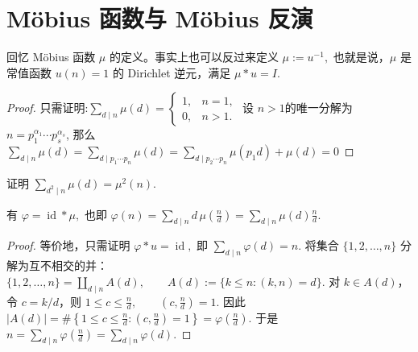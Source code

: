 \section{Möbius 函数与 Möbius 反演}

回忆 Möbius 函数 $\mu$ 的定义。事实上也可以反过来定义
\(\textstyle \mu:=\allowbreak{}u^{-1},\allowbreak{}\)
也就是说，$\mu$ 是常值函数 $u(n)=1$ 的 Dirichlet 逆元，满足
\(\textstyle \mu*u=\allowbreak{}I.\)

\begin{proof}
只需证明:\(\textstyle \sum_{d\mid n}\mu(d)= \begin{cases} 1, & n=1,\\ 0, & n>1. \end{cases}\)
设 $n>1$的唯一分解为 $n=p_1^{\alpha_1} \cdots p_s^{\alpha_s}$, 
那么 \(\textstyle \sum_{d\mid\allowbreak{} n}\mu(d)=\allowbreak{}\sum_{d\mid\allowbreak{} p_1\cdots p_n}\mu(d)=\allowbreak{}\sum_{d\mid\allowbreak{} p_2\cdots p_n} \mu(p_1d)+\allowbreak{}\mu(d)=\allowbreak{}0\)

\end{proof}

\begin{exercise}
	证明
	\(\textstyle \sum_{d^2\mid\allowbreak{} n}\mu(d)=\allowbreak{}\mu^2(n).\)
\end{exercise}


\begin{example}
	有
	\(\textstyle \varphi=\allowbreak{}\operatorname{id}*\mu,\allowbreak{}\)
	也即
	\(\textstyle \varphi(n) =\allowbreak{} \sum_{d\mid\allowbreak{} n}d\,\mu\left(\frac nd\right) =\allowbreak{} \sum_{d\mid\allowbreak{} n}\mu(d)\frac nd.\)
\end{example}

\begin{proof}
	等价地，只需证明
	\(\textstyle \varphi*u=\allowbreak{}\operatorname{id},\allowbreak{}\)
	即
	\(\textstyle \sum_{d\mid\allowbreak{} n}\varphi(d)=\allowbreak{}n.\)
	将集合 $\{1,2,\ldots,n\}$ 分解为互不相交的并：
	\(\textstyle \{1,\allowbreak{}2,\allowbreak{}\ldots,\allowbreak{}n\} =\allowbreak{} \coprod_{d\mid\allowbreak{} n} A(d),\allowbreak{} \qquad A(d):=\allowbreak{}\{k\leq\allowbreak{} n:(k,\allowbreak{}n)=\allowbreak{}d\}.\)
	对 $k\in A(d)$，令 $c=k/d$，则
	\(\textstyle 1\leq\allowbreak{} c\leq\allowbreak{} \frac nd,\allowbreak{}\qquad \left(c,\allowbreak{}\frac nd\right)=\allowbreak{}1.\)
	因此
	\(\textstyle |A(d)| =\allowbreak{} \#\left\{1\leq\allowbreak{} c\leq\allowbreak{} \frac nd:\left(c,\allowbreak{}\frac nd\right)=\allowbreak{}1\right\} =\allowbreak{} \varphi\left(\frac nd\right).\)
	于是
	\(\textstyle n =\allowbreak{} \sum_{d\mid\allowbreak{} n}\varphi\left(\frac nd\right) =\allowbreak{} \sum_{d\mid\allowbreak{} n}\varphi(d).\)
\end{proof}


